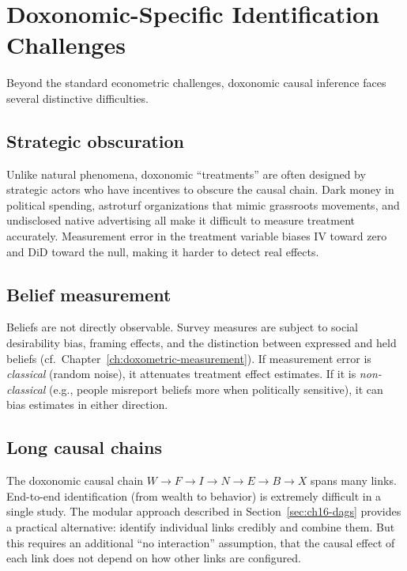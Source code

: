 \section{Doxonomic-Specific Identification Challenges}
\label{sec:ch16-challenges}

Beyond the standard econometric challenges, doxonomic causal inference faces several distinctive difficulties.

\subsection{Strategic obscuration}

Unlike natural phenomena, doxonomic ``treatments'' are often designed by strategic actors who have incentives to obscure the causal chain.
Dark money in political spending, astroturf organizations that mimic grassroots movements, and undisclosed native advertising all make it difficult to measure treatment accurately.
Measurement error in the treatment variable biases IV toward zero and DiD toward the null, making it harder to detect real effects.

\subsection{Belief measurement}

Beliefs are not directly observable.
Survey measures are subject to social desirability bias, framing effects, and the distinction between expressed and held beliefs (cf.\ Chapter~\ref{ch:doxometric-measurement}).
If measurement error is \emph{classical} (random noise), it attenuates treatment effect estimates.
If it is \emph{non-classical} (e.g., people misreport beliefs more when politically sensitive), it can bias estimates in either direction.

\subsection{Long causal chains}

The doxonomic causal chain $W \to F \to I \to N \to E \to B \to X$ spans many links.
End-to-end identification (from wealth to behavior) is extremely difficult in a single study.
The modular approach described in Section~\ref{sec:ch16-dags} provides a practical alternative: identify individual links credibly and combine them.
But this requires an additional ``no interaction'' assumption, that the causal effect of each link does not depend on how other links are configured.


